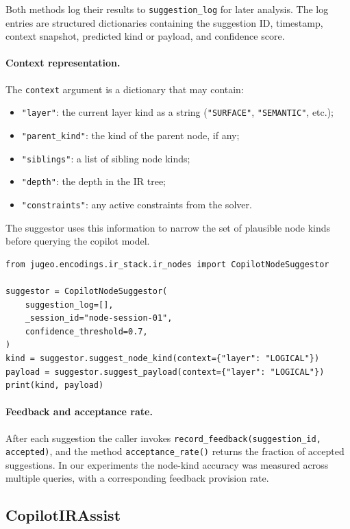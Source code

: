 \documentclass[11pt]{article}
\newcommand{\CNS}{\mathsf{CopilotNodeSuggestor}}
\begin{document}
Both methods log their results to \texttt{suggestion\_log} for
later analysis.  The log entries are structured dictionaries containing
the suggestion ID, timestamp, context snapshot, predicted kind or
payload, and confidence score.

\paragraph{Context representation.}
The \texttt{context} argument is a dictionary that may contain:
\begin{itemize}
\item \texttt{"layer"}: the current layer kind as a string
  (\texttt{"SURFACE"}, \texttt{"SEMANTIC"}, etc.);
\item \texttt{"parent\_kind"}: the kind of the parent node, if any;
\item \texttt{"siblings"}: a list of sibling node kinds;
\item \texttt{"depth"}: the depth in the IR tree;
\item \texttt{"constraints"}: any active constraints from the solver.
\end{itemize}
The suggestor uses this information to narrow the set of plausible
node kinds before querying the copilot model.

\begin{lstlisting}[style=jugeo-python, caption={Using $\CNS$
  to suggest a node kind and payload.}]
from jugeo.encodings.ir_stack.ir_nodes import CopilotNodeSuggestor

suggestor = CopilotNodeSuggestor(
    suggestion_log=[],
    _session_id="node-session-01",
    confidence_threshold=0.7,
)
kind = suggestor.suggest_node_kind(context={"layer": "LOGICAL"})
payload = suggestor.suggest_payload(context={"layer": "LOGICAL"})
print(kind, payload)
\end{lstlisting}

\paragraph{Feedback and acceptance rate.}
After each suggestion the caller invokes
\texttt{record\_feedback(suggestion\_id, accepted)}, and the method
\texttt{acceptance\_rate()} returns the fraction of accepted
suggestions.  In our experiments the node-kind accuracy was measured
across multiple queries, with
a corresponding feedback provision rate.

\subsection{CopilotIRAssist}\label{sec:cia}
\end{document}
